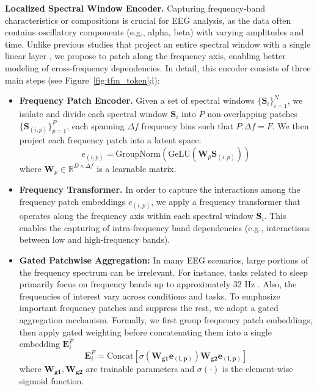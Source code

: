 \noindent\textbf{Localized Spectral Window Encoder. } Capturing frequency-band characteristics or compositions is crucial for EEG analysis, as the data often contains oscillatory components (e.g., alpha, beta) with varying amplitudes and time.  
Unlike previous studies that project an entire spectral window with a single linear layer \cite{yang2024biot}, we propose to patch along the frequency axis, enabling better modeling of cross-frequency dependencies. In detail, this encoder consists of three main steps (see Figure~\ref{fig:tfm_token}d):
\begin{itemize}[left=0pt]
    \item \textbf{Frequency Patch Encoder. } Given a set of spectral windows $\{\mathbf{S}_i\}_{i=1}^N$, we isolate and divide each spectral window $\mathbf{S}_i$ into $P$ non-overlapping patches $\{\mathbf{S}_{(i,p)}\}_{p=1}^P$, each spanning $\Delta f$ frequency bins such that $P.\Delta f = F$. We then project each frequency patch into a latent space:
    $$
    e_{(i,p)} = \text{GroupNorm}\left(\text{GeLU}\left(\mathbf{W}_{p}\mathbf{S}_{(i,p)}\right)\right)
    $$
    where $\mathbf{W}_{p}\in \mathbb{R}^{D\times \Delta f}$ is a learnable matrix.
    
    \item \textbf{Frequency Transformer. } In order to capture the interactions among the frequency patch embeddings $e_{(i,p)}$, we apply a frequency transformer that operates along the frequency axis within each spectral window $\mathbf{S}_i$. This enables the capturing of intra-frequency band dependencies (e.g., interactions between low and high-frequency bands).
    
    \item \textbf{Gated Patchwise Aggregation:} In many EEG scenarios, large portions of the frequency spectrum can be irrelevant.
    For instance, tasks related to sleep primarily focus on frequency bands up to approximately 32 Hz \cite{Chen2023TNSRE}. 
    Also, the frequencies of interest vary across conditions and tasks. 
    To emphasize important frequency patches and suppress the rest, we adopt a gated aggregation mechanism. 
    Formally, we first group frequency patch embeddings, then apply gated weighting before concatenating them into a single embedding $\mathbf{E}^F_i$
    $$\mathbf{E}^F_i = \text{Concat}\left[\sigma\left(\mathbf{W_{g1}e_{(i,p)}}\right)\mathbf{W_{g2}e_{(i,p)}}\right]$$
    where $\mathbf{W_{g1}},\mathbf{W_{g2}}$ are trainable parameters and $\sigma(\cdot)$ is the element-wise sigmoid function.
\end{itemize}

